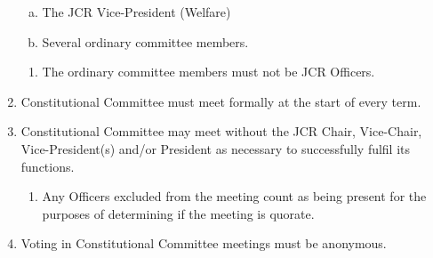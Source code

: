 \documentclass[12pt]{article}  %
\begin{document}
\begin{enumerate}
\begin{enumerate}[(a)]
		\item The JCR Vice-President (Welfare)
		\item Several ordinary committee members.
	\end{enumerate}
	\begin{enumerate}
		\item The ordinary committee members must not be JCR Officers.
	\end{enumerate}
	\item Constitutional Committee must meet formally at the start of every term.
	\item Constitutional Committee may meet without the JCR Chair, Vice-Chair, Vice-President(s) and/or President as necessary to successfully fulfil its functions.
	\begin{enumerate}
		\item Any Officers excluded from the meeting count as being present for the purposes of determining if the meeting is quorate.
	\end{enumerate}
	\item Voting in Constitutional Committee meetings must be anonymous.

\end{enumerate}
\end{document}
